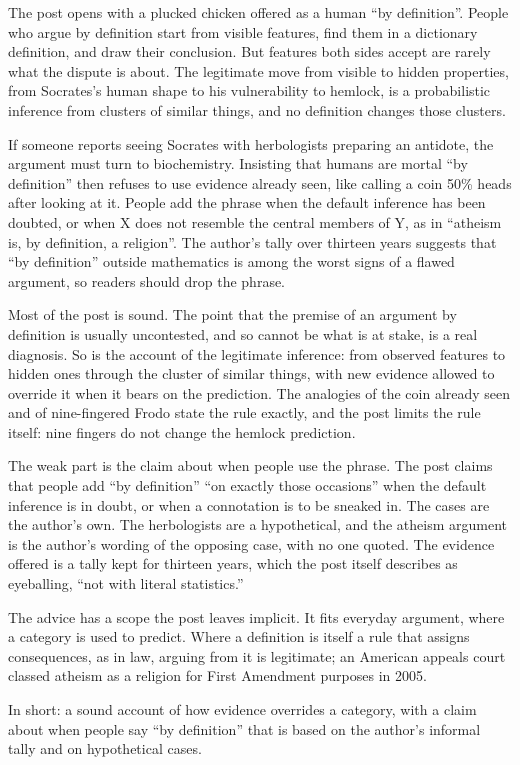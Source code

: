 \begin{afterword}
\summaryhead

The post opens with a plucked chicken offered as a human ``by definition''. People who argue by definition start from visible features, find them in a dictionary definition, and draw their conclusion. But features both sides accept are rarely what the dispute is about. The legitimate move from visible to hidden properties, from Socrates's human shape to his vulnerability to hemlock, is a probabilistic inference from clusters of similar things, and no definition changes those clusters.

If someone reports seeing Socrates with herbologists preparing an antidote, the argument must turn to biochemistry. Insisting that humans are mortal ``by definition'' then refuses to use evidence already seen, like calling a coin 50\% heads after looking at it. People add the phrase when the default inference has been doubted, or when X does not resemble the central members of Y, as in ``atheism is, by definition, a religion''. The author's tally over thirteen years suggests that ``by definition'' outside mathematics is among the worst signs of a flawed argument, so readers should drop the phrase.

\responsehead

Most of the post is sound. The point that the premise of an argument by definition is usually uncontested, and so cannot be what is at stake, is a real diagnosis. So is the account of the legitimate inference: from observed features to hidden ones through the cluster of similar things, with new evidence allowed to override it when it bears on the prediction. The analogies of the coin already seen and of nine-fingered Frodo state the rule exactly, and the post limits the rule itself: nine fingers do not change the hemlock prediction.

The weak part is the claim about when people use the phrase. The post claims that people add ``by definition'' ``on exactly those occasions'' when the default inference is in doubt, or when a connotation is to be sneaked in. The cases are the author's own. The herbologists are a hypothetical, and the atheism argument is the author's wording of the opposing case, with no one quoted. The evidence offered is a tally kept for thirteen years, which the post itself describes as eyeballing, ``not with literal statistics.''

The advice has a scope the post leaves implicit. It fits everyday argument, where a category is used to predict. Where a definition is itself a rule that assigns consequences, as in law, arguing from it is legitimate; an American appeals court classed atheism as a religion for First Amendment purposes in 2005.

In short: a sound account of how evidence overrides a category, with a claim about when people say ``by definition'' that is based on the author's informal tally and on hypothetical cases.
\end{afterword}
